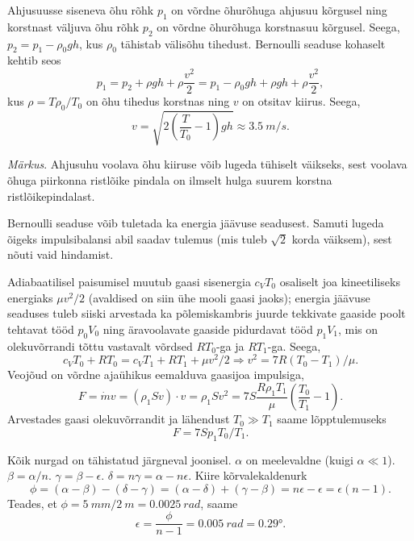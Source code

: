 \documentclass[10pt]{article}
\begin{document}
{%

\solu
Ahjusuusse siseneva õhu rõhk $p_1$ on võrdne õhurõhuga ahjusuu kõrgusel ning korstnast väljuva õhu rõhk $p_2$ on võrdne õhurõhuga korstnasuu kõrgusel. Seega, $p_2=p_1-\rho_0 gh$, kus $\rho_0$ tähistab välisõhu tihedust. Bernoulli seaduse kohaselt kehtib seos 
\[
p_1=p_2 + \rho gh + \rho \frac{v^2}{2} = p_1 - \rho_0 gh + \rho gh+\rho \frac{v^2}{2},
\]
kus $\rho=T\rho_0/T_0$ on õhu tihedus korstnas ning $v$ on otsitav kiirus. Seega,
\[
v=\sqrt {2\left(\frac T{T_0}-1\right)gh}\approx \SI{3,5}{m/s}.
\]

\emph{Märkus}. Ahjusuhu voolava õhu kiiruse võib lugeda tühiselt väikseks, sest voolava õhuga piirkonna ristlõike pindala on ilmselt hulga suurem korstna ristlõikepindalast.


Bernoulli seaduse võib tuletada ka energia jäävuse seadusest. Samuti lugeda õigeks impulsibalansi abil saadav tulemus (mis tuleb $\sqrt 2$ korda väiksem), sest nõuti vaid hindamist.
\probend
\bigskip


\solu
Adiabaatilisel paisumisel muutub gaasi sisenergia $c_VT_0$ osaliselt joa kineetiliseks energiaks $\mu v^2/2$ (avaldised on siin ühe mooli gaasi jaoks); 
energia jäävuse seaduses tuleb siiski arvestada ka põlemiskambris juurde tekkivate gaaside poolt tehtavat tööd $p_0V_0$ ning
äravoolavate gaaside pidurdavat tööd $p_1V_1$, mis on olekuvõrrandi tõttu
vastavalt võrdsed $RT_0$-ga ja $RT_1$-ga. Seega, 
$$c_VT_0+RT_0=c_VT_1+RT_1+\mu v^2/2 \Rightarrow v^2=7R(T_0-T_1)/\mu.$$
Veojõud on võrdne ajaühikus eemalduva gaasijoa impulsiga,
$$F=\dot m v =(\rho_1 Sv)\cdot v=\rho_1 S v^2 = 7S\frac{R\rho_1T_1}{\mu}\left(\frac{T_0}{T_1}-1\right).$$
Arvestades gaasi olekuvõrrandit ja lähendust $T_0\gg T_1$ saame lõpptulemuseks
$$F=7Sp_1T_0/T_1.$$
\probend
\bigskip


\solu
Kõik nurgad on tähistatud järgneval joonisel. $\alpha$ on meelevaldne (kuigi $\alpha \ll 1$). $\beta = \alpha /n$. $\gamma = \beta - \epsilon$. $\delta = n\gamma = \alpha - n\epsilon$. Kiire kõrvalekaldenurk
\[
\phi=(\alpha-\beta)-(\delta-\gamma)=(\alpha-\delta)+(\gamma-\beta)=n \epsilon-\epsilon=\epsilon(n-1).
\]
Teades, et $\phi = \SI{5}{mm}/\SI{2}{m} = \SI{0.0025}{rad}$, saame
\[
\epsilon=\frac{\phi}{n-1}=\SI{0,005}{rad}=\ang{0,29}.
\]

}
\end{document}
